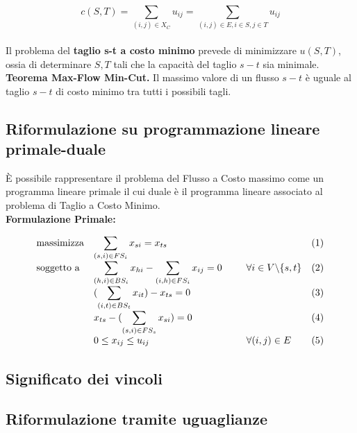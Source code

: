 \documentclass{article}
\begin{document}
\[c(S,T) = \sum_{(i, j) \in X_{C}} u_{ij} = \sum_{(i,j) \in E, i \in S, j \in T} u_{ij} \]\\
Il problema del \textbf{taglio s-t a costo minimo} prevede di minimizzare $u(S,T)$, ossia di determinare $S, T$ tali che la capacità del taglio $s-t$ sia minimale.\\

\textbf{Teorema Max-Flow Min-Cut.} Il massimo valore di un flusso $s-t$ è uguale al taglio $s-t$ di costo minimo tra tutti i possibili tagli.
\pagebreak

\subsection{Riformulazione su programmazione lineare primale-duale}
È possibile rappresentare il problema del Flusso a Costo massimo come un programma lineare primale il cui duale è il programma lineare associato al problema di Taglio a Costo Minimo.\\


\textbf{Formulazione Primale:}

\begin{equation*}
    \begin{array}{ll@{}ll}
    \text{massimizza}   & \displaystyle\sum_{(s, i) \in FS_{i}} x_{si} = x_{ts} & \;\;\;\;\;\;\;\;\; &(1)\\
    \text{soggetto a}   & \displaystyle\sum_{(h, i) \in BS_{i}} x_{hi} - \sum_{(i, h) \in FS_{i}} x_{ij} = 0 \;\;\;\;\;\;\;\;\; &    \forall i \in V \backslash \{s,t\}&(2)\\
                        & (\displaystyle\sum_{(i, t) \in BS_{t}} x_{it}) - x_{ts} = 0 & &(3)\\
                        &  x_{ts} - (\displaystyle\sum_{(s,i) \in FS_{s}} x_{si}) = 0 & &(4)\\
                        &0 \leq x_{ij} \leq u_{ij} & \forall (i,j) \in E &(5)
    \end{array}
    \end{equation*}

\subsection{Significato dei vincoli}
\subsection{Riformulazione tramite uguaglianze}

\end{document}
